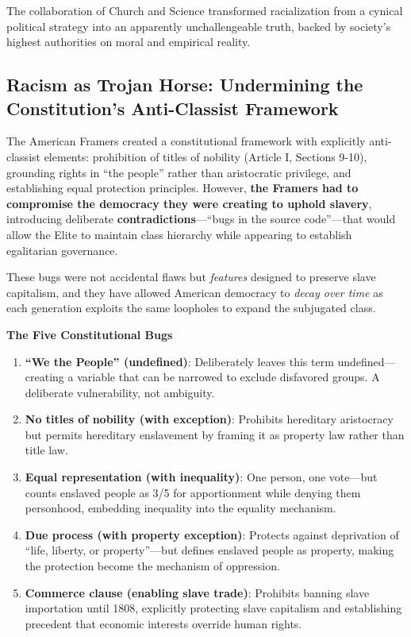 \documentclass[12pt]{article}
\begin{document}
The collaboration of Church and Science transformed racialization from a cynical political strategy into an apparently unchallengeable truth, backed by society's highest authorities on moral and empirical reality.

\subsection{Racism as Trojan Horse: Undermining the Constitution's Anti-Classist Framework}

The American Framers created a constitutional framework with explicitly anti-classist elements: prohibition of titles of nobility (Article I, Sections 9-10), grounding rights in ``the people'' rather than aristocratic privilege, and establishing equal protection principles. However, \textbf{the Framers had to compromise the democracy they were creating to uphold slavery}, introducing deliberate \textbf{contradictions}---``bugs in the source code''---that would allow the Elite to maintain class hierarchy while appearing to establish egalitarian governance.

These bugs were not accidental flaws but \textit{features} designed to preserve slave capitalism, and they have allowed American democracy to \textit{decay over time} as each generation exploits the same loopholes to expand the subjugated class.

\textbf{The Five Constitutional Bugs}

\begin{enumerate}
    \item \textbf{``We the People'' (undefined)}: Deliberately leaves this term undefined---creating a variable that can be narrowed to exclude disfavored groups. A deliberate vulnerability, not ambiguity.
    
    \item \textbf{No titles of nobility (with exception)}: Prohibits hereditary aristocracy but permits hereditary enslavement by framing it as property law rather than title law.
    
    \item \textbf{Equal representation (with inequality)}: One person, one vote---but counts enslaved people as 3/5 for apportionment while denying them personhood, embedding inequality into the equality mechanism.
    
    \item \textbf{Due process (with property exception)}: Protects against deprivation of ``life, liberty, or property''---but defines enslaved people as property, making the protection become the mechanism of oppression.
    
    \item \textbf{Commerce clause (enabling slave trade)}: Prohibits banning slave importation until 1808, explicitly protecting slave capitalism and establishing precedent that economic interests override human rights.
\end{enumerate}
\end{document}

